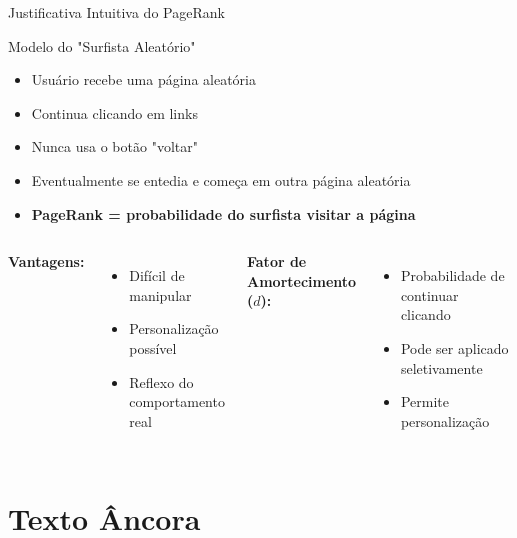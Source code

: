 \documentclass[aspectratio=169]{beamer}
\begin{document}
\begin{frame}{Justificativa Intuitiva do PageRank}
\begin{block}{Modelo do "Surfista Aleatório"}
\begin{itemize}
\item Usuário recebe uma página aleatória
\item Continua clicando em links
\item Nunca usa o botão "voltar"
\item Eventualmente se entedia e começa em outra página aleatória
\item \textbf{PageRank = probabilidade do surfista visitar a página}
\end{itemize}
\end{block}

\vspace{0.3cm}
\begin{columns}
\textbf{Vantagens:}
\begin{itemize}
\item Difícil de manipular
\item Personalização possível
\item Reflexo do comportamento real
\end{itemize}

\textbf{Fator de Amortecimento ($d$):}
\begin{itemize}
\item Probabilidade de continuar clicando
\item Pode ser aplicado seletivamente
\item Permite personalização
\end{itemize}
\end{columns}
\end{frame}

\section{Texto Âncora}
\end{document}
